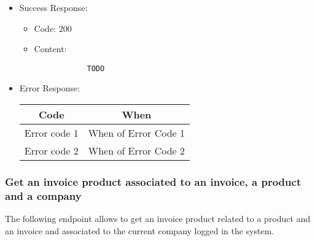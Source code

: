 \begin{itemize}
    \item Success Response: 
    \begin{itemize}
        \item Code: 200
        \item Content:
        \begin{lstlisting}
            TODO
        \end{lstlisting}    
    \end{itemize}
    
    \item Error Response:
    \begin{table}[!h]
    \centering 
    \begin{tabular}{|c|c|}
    \hline
    \multicolumn{1}{|c|}{\textbf{Code}} & \multicolumn{1}{c|}{\textbf{When}} \\ \hline
    Error code 1 & When of Error Code 1 \\\hline
    Error code 2 & When of Error Code 2 \\\hline
    \end{tabular} 
    \end{table} 
    
\end{itemize}


\subsubsection*{Get an invoice product associated to an invoice, a product and a company}

The following endpoint allows to get an invoice product related to a product and an invoice and associated to the current company logged in the system.

